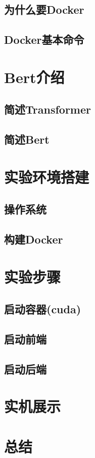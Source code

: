 \documentclass[UTF8]{ctexart}
\begin{document}
\subsection{为什么要Docker}

\subsection{Docker基本命令}

\section{Bert介绍}

\subsection{简述Transformer}

\subsection{简述Bert}

\section{实验环境搭建}

\subsection{操作系统}

\subsection{构建Docker}

\section{实验步骤}

\subsection{启动容器(cuda)}

\subsection{启动前端}

\subsection{启动后端}

\section{实机展示}

\section{总结}
\end{document}
